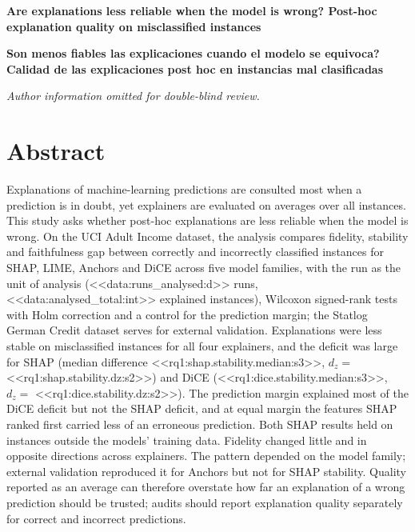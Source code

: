 \documentclass[12pt,letterpaper]{article}
\newif\iffull
\begin{document}
\begin{center}
{\large\bfseries Are explanations less reliable when the model is wrong? Post-hoc
explanation quality on misclassified instances\par}
\medskip
{\large\bfseries {\textquestiondown}Son menos fiables las explicaciones cuando el modelo se
equivoca? Calidad de las explicaciones post hoc en instancias mal clasificadas\par}
\medskip
\iffull
Jonathan Herrera-V\'asquez\par
PhD candidate. Department of Computer Science, Universidad Americana de Europa
(UNADE), Canc\'un, Quintana Roo, Mexico.\par
jonnabio@gmail.com \quad ORCID: \url{https://orcid.org/0000-0002-7149-6635}
\else
\textit{Author information omitted for double-blind review.}
\fi
\end{center}

\section*{Abstract}
Explanations of machine-learning predictions are consulted most when a prediction is in
doubt, yet explainers are evaluated on averages over all instances. This study asks whether
post-hoc explanations are less reliable when the model is wrong. On the UCI Adult Income
dataset, the analysis compares fidelity, stability and faithfulness gap
between correctly and incorrectly classified instances for SHAP, LIME, Anchors and DiCE
across five model families, with the run as the unit of analysis
(<<data:runs_analysed:d>> runs, <<data:analysed_total:int>> explained instances), Wilcoxon
signed-rank tests with Holm correction and a control for the prediction margin; the
Statlog German Credit dataset serves for external validation. Explanations were less
stable on misclassified instances for all four explainers, and the deficit was large for SHAP (median difference
<<rq1:shap.stability.median:s3>>, $d_z =$ <<rq1:shap.stability.dz:s2>>) and DiCE
(<<rq1:dice.stability.median:s3>>, $d_z =$ <<rq1:dice.stability.dz:s2>>). The prediction
margin explained most of the DiCE deficit but not the SHAP deficit, and at equal margin
the features SHAP ranked first carried less of an erroneous prediction. Both SHAP results
held on instances outside the models' training data. Fidelity changed little and in
opposite directions across explainers. The pattern depended on the model family; external
validation reproduced it for Anchors but not for SHAP stability. Quality reported as an average can therefore
overstate how far an explanation of a wrong prediction should be trusted; audits should
report explanation quality separately for correct and incorrect predictions.
\end{document}
